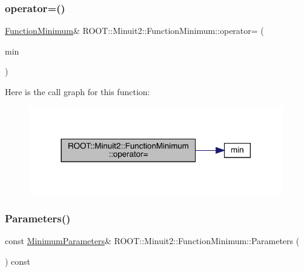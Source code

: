 \subsubsection{\texorpdfstring{operator=()}{operator=()}\hspace{0.1cm}{\footnotesize\ttfamily [2/2]}}
{\footnotesize\ttfamily \mbox{\hyperlink{classROOT_1_1Minuit2_1_1FunctionMinimum}{Function\+Minimum}}\& R\+O\+O\+T\+::\+Minuit2\+::\+Function\+Minimum\+::operator= (\begin{DoxyParamCaption}\item[{const \mbox{\hyperlink{classROOT_1_1Minuit2_1_1FunctionMinimum}{Function\+Minimum}} \&}]{min }\end{DoxyParamCaption})\hspace{0.3cm}{\ttfamily [inline]}}

Here is the call graph for this function\+:
\nopagebreak
\begin{figure}[H]
\begin{center}
\leavevmode
\includegraphics[width=314pt]{d4/dfb/classROOT_1_1Minuit2_1_1FunctionMinimum_a107909f1a994436795eb310f951f14cb_cgraph}
\end{center}
\end{figure}
\mbox{\label{classROOT_1_1Minuit2_1_1FunctionMinimum_a069ba097db08f87582b309330ef8aa6e}} 
\subsubsection{\texorpdfstring{Parameters()}{Parameters()}\hspace{0.1cm}{\footnotesize\ttfamily [1/2]}}
{\footnotesize\ttfamily const \mbox{\hyperlink{classROOT_1_1Minuit2_1_1MinimumParameters}{Minimum\+Parameters}}\& R\+O\+O\+T\+::\+Minuit2\+::\+Function\+Minimum\+::\+Parameters (\begin{DoxyParamCaption}{ }\end{DoxyParamCaption}) const\hspace{0.3cm}{\ttfamily [inline]}}

